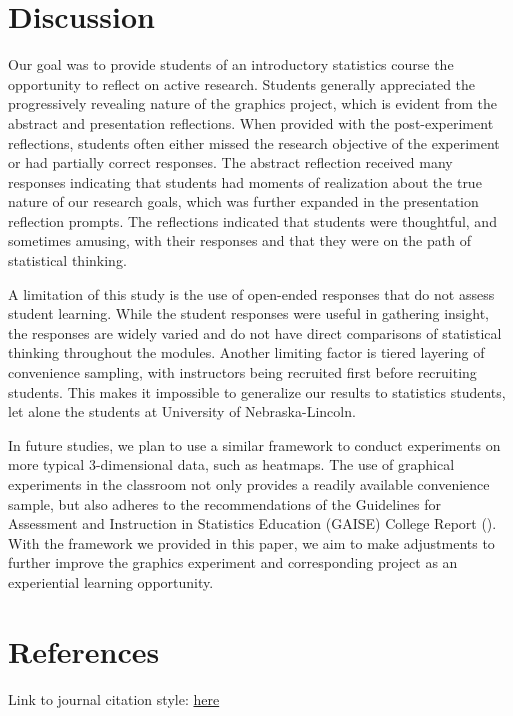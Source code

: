 \documentclass[
]{article}
\begin{document}
\section{Discussion}\label{discussion}

Our goal was to provide students of an introductory statistics course
the opportunity to reflect on active research. Students generally
appreciated the progressively revealing nature of the graphics project,
which is evident from the abstract and presentation reflections. When
provided with the post-experiment reflections, students often either
missed the research objective of the experiment or had partially correct
responses. The abstract reflection received many responses indicating
that students had moments of realization about the true nature of our
research goals, which was further expanded in the presentation
reflection prompts. The reflections indicated that students were
thoughtful, and sometimes amusing, with their responses and that they
were on the path of statistical thinking.

A limitation of this study is the use of open-ended responses that do
not assess student learning. While the student responses were useful in
gathering insight, the responses are widely varied and do not have
direct comparisons of statistical thinking throughout the modules.
Another limiting factor is tiered layering of convenience sampling, with
instructors being recruited first before recruiting students. This makes
it impossible to generalize our results to statistics students, let
alone the students at University of Nebraska-Lincoln.

In future studies, we plan to use a similar framework to conduct
experiments on more typical 3-dimensional data, such as heatmaps. The
use of graphical experiments in the classroom not only provides a
readily available convenience sample, but also adheres to the
recommendations of the Guidelines for Assessment and Instruction in
Statistics Education (GAISE) College Report
(). With the
framework we provided in this paper, we aim to make adjustments to
further improve the graphics experiment and corresponding project as an
experiential learning opportunity.

\section{References}\label{references}

Link to journal citation style:
\href{https://www.tandfonline.com/action/authorSubmission?show=instructions&journalCode=ujse21\#refs}{here}
\end{document}
